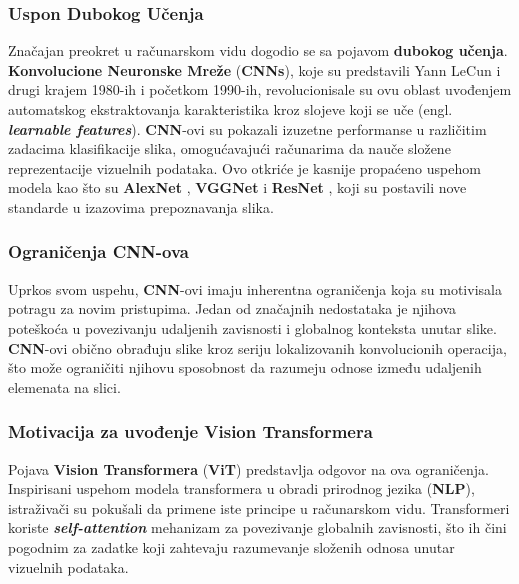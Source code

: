 \documentclass[12pt]{article}
\begin{document}
   \subsubsection{Uspon Dubokog Učenja}

   Značajan preokret u računarskom vidu dogodio se sa pojavom \textbf{dubokog učenja}. 
   \textbf{Konvolucione Neuronske Mreže} (\textbf{CNNs}), koje su predstavili Yann LeCun i drugi \cite{lecun_cnn} 
   krajem 1980-ih i početkom 1990-ih, revolucionisale su ovu oblast uvođenjem automatskog 
   ekstraktovanja karakteristika kroz slojeve koji se uče (engl. \textbf{\textit{learnable features}}). \textbf{CNN}-ovi su pokazali izuzetne 
   performanse u različitim zadacima klasifikacije slika, omogućavajući računarima da 
   nauče složene reprezentacije vizuelnih podataka. Ovo otkriće je kasnije propaćeno uspehom modela 
   kao što su \textbf{AlexNet} \cite{alexnet}, \textbf{VGGNet} \cite{vgg} i \textbf{ResNet} \cite{resnet}, koji su postavili nove standarde u izazovima 
   prepoznavanja slika.

   \subsubsection{Ograničenja CNN-ova}

   Uprkos svom uspehu, \textbf{CNN}-ovi imaju inherentna ograničenja 
   koja su motivisala potragu za novim pristupima. Jedan od 
   značajnih nedostataka je njihova poteškoća u povezivanju udaljenih zavisnosti
   i globalnog konteksta unutar slike. \textbf{CNN}-ovi obično obrađuju slike kroz seriju 
   lokalizovanih konvolucionih operacija, što može ograničiti njihovu sposobnost da 
   razumeju odnose između udaljenih elemenata na slici.

   \subsubsection{Motivacija za uvođenje Vision Transformera}

   Pojava \textbf{Vision Transformera} (\textbf{ViT}) predstavlja odgovor na ova ograničenja. 
   Inspirisani uspehom modela transformera u obradi prirodnog jezika (\textbf{NLP}), 
   istraživači su pokušali da primene iste principe u računarskom vidu. 
   Transformeri koriste \textbf{\textit{self-attention}} mehanizam za povezivanje globalnih zavisnosti, 
   što ih čini pogodnim za zadatke koji zahtevaju razumevanje 
   složenih odnosa unutar vizuelnih podataka.
   
   \newpage
\end{document}
